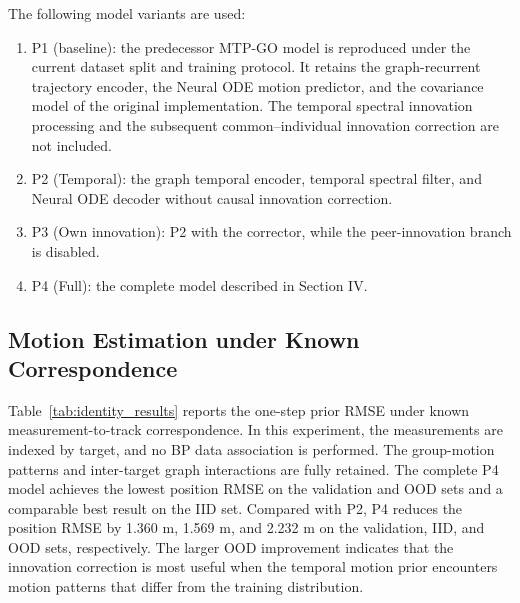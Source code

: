 \documentclass[10pt,doublecolumn]{IEEEtaes}
\begin{document}
The following model variants are used:
\begin{enumerate}
\item P1 (baseline): the predecessor MTP-GO model \cite{westny2023mtp} is reproduced under
the current dataset split and training protocol. It retains the graph-recurrent
trajectory encoder, the Neural ODE motion predictor, and the covariance model
of the original implementation. The temporal spectral innovation processing
and the subsequent common--individual innovation correction are not included.
\item P2 (Temporal): the graph temporal encoder, temporal spectral filter, and Neural ODE decoder without causal innovation correction.
\item P3 (Own innovation): P2 with the corrector, while the peer-innovation branch is disabled.
\item P4 (Full): the complete model described in Section IV.
\end{enumerate}

\subsection{Motion Estimation under Known Correspondence}

Table~\ref{tab:identity_results} reports the one-step prior RMSE under known measurement-to-track correspondence. In this experiment, the measurements are indexed by target, and no BP data association is performed. The group-motion patterns and inter-target graph interactions are fully retained. The complete P4 model achieves the lowest position RMSE on the validation and OOD sets and a comparable best result on the IID set. Compared with P2, P4 reduces the position RMSE by 1.360 m, 1.569 m, and 2.232 m on the validation, IID, and OOD sets, respectively. The larger OOD improvement indicates that the innovation correction is most useful when the temporal motion prior encounters motion patterns that differ from the training distribution.

\begin{table}[!t]
\centering
\caption{One-step prediction RMSE under known measurement-to-track correspondence on IID and OOD group trajectories. The units are meters for position and meters per second for velocity.}
\label{tab:identity_results}
\end{table}
\end{document}
